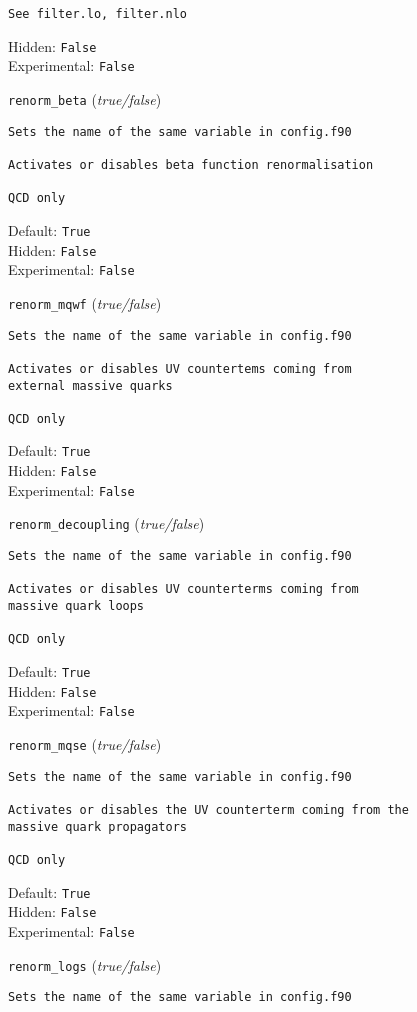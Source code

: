 \begin{basedescript}{\desclabelstyle{\pushlabel}}
\begin{verbatim}
See filter.lo, filter.nlo
\end{verbatim}
Hidden: \verb|False|
\\Experimental: \verb|False|
\\\item[\colorbox{gray!30}{\texttt{renorm\_beta}}] (\textit{true/false})
\begin{verbatim}
Sets the name of the same variable in config.f90

Activates or disables beta function renormalisation

QCD only
\end{verbatim}
Default: \verb|True|
\\Hidden: \verb|False|
\\Experimental: \verb|False|
\\\item[\colorbox{gray!30}{\texttt{renorm\_mqwf}}] (\textit{true/false})
\begin{verbatim}
Sets the name of the same variable in config.f90

Activates or disables UV countertems coming from
external massive quarks

QCD only
\end{verbatim}
Default: \verb|True|
\\Hidden: \verb|False|
\\Experimental: \verb|False|
\\\item[\colorbox{gray!30}{\texttt{renorm\_decoupling}}] (\textit{true/false})
\begin{verbatim}
Sets the name of the same variable in config.f90

Activates or disables UV counterterms coming from
massive quark loops

QCD only
\end{verbatim}
Default: \verb|True|
\\Hidden: \verb|False|
\\Experimental: \verb|False|
\\\item[\colorbox{gray!30}{\texttt{renorm\_mqse}}] (\textit{true/false})
\begin{verbatim}
Sets the name of the same variable in config.f90

Activates or disables the UV counterterm coming from the
massive quark propagators

QCD only
\end{verbatim}
Default: \verb|True|
\\Hidden: \verb|False|
\\Experimental: \verb|False|
\\\item[\colorbox{gray!30}{\texttt{renorm\_logs}}] (\textit{true/false})
\begin{verbatim}
Sets the name of the same variable in config.f90


\end{verbatim}
\end{basedescript}
